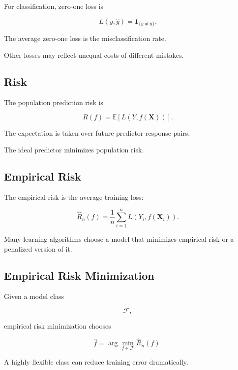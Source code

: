 For classification, zero-one loss is

\[
\boxed{
L
(
y,\widehat{y}
)
=
\mathbf{1}_{\{y\neq\widehat{y}\}}.
}
\]

The average zero-one loss is the misclassification rate.

Other losses may reflect unequal costs of different mistakes.

\subsection{Risk}
\label{subsec:learning-risk}

The population prediction risk is

\[
\boxed{
R(f)
=
\mathbb{E}
[
L
(
Y,f(\mathbf{X})
)
].
}
\]

The expectation is taken over future predictor-response pairs.

The ideal predictor minimizes population risk.

\subsection{Empirical Risk}
\label{subsec:empirical-risk}

The empirical risk is the average training loss:

\[
\boxed{
\widehat{R}_n(f)
=
\frac1n
\sum_{i=1}^{n}
L
(
Y_i,
f(\mathbf{X}_i)
).
}
\]

Many learning algorithms choose a model that minimizes empirical risk or
a penalized version of it.

\subsection{Empirical Risk Minimization}
\label{subsec:empirical-risk-minimization}

Given a model class

\[
\mathcal{F},
\]

empirical risk minimization chooses

\[
\boxed{
\widehat{f}
=
\arg\min_{f\in\mathcal{F}}
\widehat{R}_n(f).
}
\]

A highly flexible class can reduce training error dramatically.

